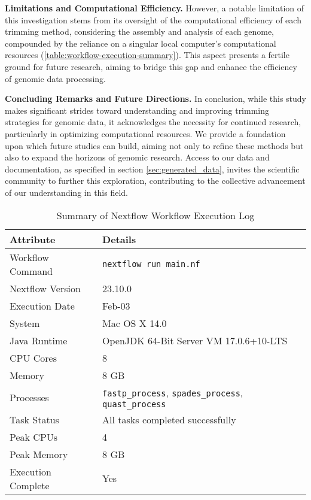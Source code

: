 \textbf{Limitations and Computational Efficiency.} However, a notable limitation of this investigation stems from its oversight of the computational efficiency of each trimming method, considering the assembly and analysis of each genome, compounded by the reliance on a singular local computer's computational resources (\autoref{table:workflow-execution-summary}). This aspect presents a fertile ground for future research, aiming to bridge this gap and enhance the efficiency of genomic data processing.

\textbf{Concluding Remarks and Future Directions.} In conclusion, while this study makes significant strides toward understanding and improving trimming strategies for genomic data, it acknowledges the necessity for continued research, particularly in optimizing computational resources. We provide a foundation upon which future studies can build, aiming not only to refine these methods but also to expand the horizons of genomic research. Access to our data and documentation, as specified in section \ref{sec:generated_data}, invites the scientific community to further this exploration, contributing to the collective advancement of our understanding in this field.


\begin{table}[h]
\centering
\caption{Summary of Nextflow Workflow Execution Log}
\label{table:workflow-execution-summary}
\begin{tabular}{ll}
\hline
\textbf{Attribute} & \textbf{Details} \\
\hline
Workflow Command & \texttt{nextflow run main.nf} \\
Nextflow Version & 23.10.0 \\
Execution Date & Feb-03 \\
System & Mac OS X 14.0 \\
Java Runtime & OpenJDK 64-Bit Server VM 17.0.6+10-LTS \\
CPU Cores & 8 \\
Memory & 8 GB \\
Processes & \texttt{fastp\_process}, \texttt{spades\_process}, \texttt{quast\_process} \\
Task Status & All tasks completed successfully \\
Peak CPUs & 4 \\
Peak Memory & 8 GB \\
Execution Complete & Yes \\
\hline
\end{tabular}
\end{table}
